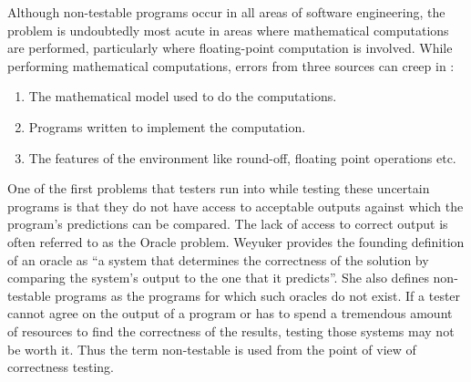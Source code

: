 Although non-testable programs occur in all areas of software engineering, the problem is undoubtedly most acute in areas where mathematical computations are performed, particularly where floating-point computation is involved. While performing mathematical computations, errors from three sources can creep in \cite{Weyuker}:

\begin{enumerate}
  \item The mathematical model used to do the computations.
  \item Programs written to implement the computation.
  \item The features of the environment like round-off, floating point operations etc.
\end{enumerate}

 One of the first problems that testers run into while testing these uncertain programs is that they do not have access to acceptable outputs against which the program's predictions can be compared. The lack of access to correct output is often referred to as the Oracle problem. Weyuker \cite{Weyuker} provides the founding definition of an oracle as \enquote{a system that determines the correctness of the solution by comparing the system's output to the one that it predicts}. She also defines non-testable programs as the programs for which such oracles do not exist. If a tester cannot agree on the output of a program or has to spend a tremendous amount of resources to find the correctness of the results, testing those systems may not be worth it. Thus the term non-testable is used from the point of view of correctness testing. 
 
